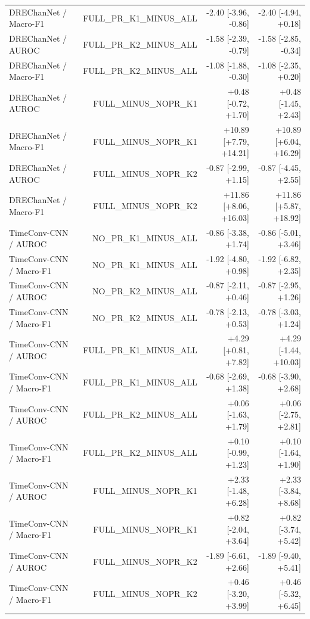 \begin{table}[t]
\begin{tabular}{lrrr}
DREChanNet / Macro-F1 & FULL\_PR\_K1\_MINUS\_ALL & -2.40 [-3.96, -0.86] & -2.40 [-4.94, +0.18] \\
DREChanNet / AUROC & FULL\_PR\_K2\_MINUS\_ALL & -1.58 [-2.39, -0.79] & -1.58 [-2.85, -0.34] \\
DREChanNet / Macro-F1 & FULL\_PR\_K2\_MINUS\_ALL & -1.08 [-1.88, -0.30] & -1.08 [-2.35, +0.20] \\
DREChanNet / AUROC & FULL\_MINUS\_NOPR\_K1 & +0.48 [-0.72, +1.70] & +0.48 [-1.45, +2.43] \\
DREChanNet / Macro-F1 & FULL\_MINUS\_NOPR\_K1 & +10.89 [+7.79, +14.21] & +10.89 [+6.04, +16.29] \\
DREChanNet / AUROC & FULL\_MINUS\_NOPR\_K2 & -0.87 [-2.99, +1.15] & -0.87 [-4.45, +2.55] \\
DREChanNet / Macro-F1 & FULL\_MINUS\_NOPR\_K2 & +11.86 [+8.06, +16.03] & +11.86 [+5.87, +18.92] \\
TimeConv-CNN / AUROC & NO\_PR\_K1\_MINUS\_ALL & -0.86 [-3.38, +1.74] & -0.86 [-5.01, +3.46] \\
TimeConv-CNN / Macro-F1 & NO\_PR\_K1\_MINUS\_ALL & -1.92 [-4.80, +0.98] & -1.92 [-6.82, +2.35] \\
TimeConv-CNN / AUROC & NO\_PR\_K2\_MINUS\_ALL & -0.87 [-2.11, +0.46] & -0.87 [-2.95, +1.26] \\
TimeConv-CNN / Macro-F1 & NO\_PR\_K2\_MINUS\_ALL & -0.78 [-2.13, +0.53] & -0.78 [-3.03, +1.24] \\
TimeConv-CNN / AUROC & FULL\_PR\_K1\_MINUS\_ALL & +4.29 [+0.81, +7.82] & +4.29 [-1.44, +10.03] \\
TimeConv-CNN / Macro-F1 & FULL\_PR\_K1\_MINUS\_ALL & -0.68 [-2.69, +1.38] & -0.68 [-3.90, +2.68] \\
TimeConv-CNN / AUROC & FULL\_PR\_K2\_MINUS\_ALL & +0.06 [-1.63, +1.79] & +0.06 [-2.75, +2.81] \\
TimeConv-CNN / Macro-F1 & FULL\_PR\_K2\_MINUS\_ALL & +0.10 [-0.99, +1.23] & +0.10 [-1.64, +1.90] \\
TimeConv-CNN / AUROC & FULL\_MINUS\_NOPR\_K1 & +2.33 [-1.48, +6.28] & +2.33 [-3.84, +8.68] \\
TimeConv-CNN / Macro-F1 & FULL\_MINUS\_NOPR\_K1 & +0.82 [-2.04, +3.64] & +0.82 [-3.74, +5.42] \\
TimeConv-CNN / AUROC & FULL\_MINUS\_NOPR\_K2 & -1.89 [-6.61, +2.66] & -1.89 [-9.40, +5.41] \\
TimeConv-CNN / Macro-F1 & FULL\_MINUS\_NOPR\_K2 & +0.46 [-3.20, +3.99] & +0.46 [-5.32, +6.45] \\
\bottomrule
\end{tabular}
\end{table}
